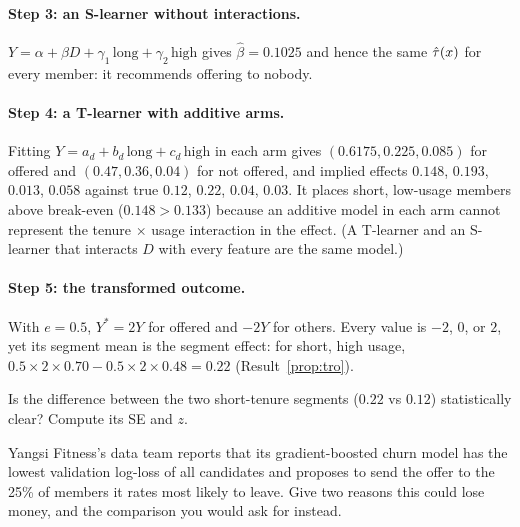 \documentclass[11pt]{article}
\begin{document}
\paragraph{Step 3: an S-learner without interactions.} $Y = \alpha + \beta D + \gamma_1\,\text{long} + \gamma_2\,\text{high}$
gives $\hat\beta = 0.1025$ and hence the same $\hat{\tau}(x)$ for every member: it recommends offering to nobody.

\paragraph{Step 4: a T-learner with additive arms.} Fitting $Y = a_d + b_d\,\text{long} + c_d\,\text{high}$ in each arm
gives $(0.6175, 0.225, 0.085)$ for offered and $(0.47, 0.36, 0.04)$ for not offered, and implied effects
$0.148$, $0.193$, $0.013$, $0.058$ against true $0.12$, $0.22$, $0.04$, $0.03$. It places short, low-usage members above
break-even ($0.148 > 0.133$) because an additive model in each arm cannot represent the tenure $\times$ usage
interaction in the effect. (A T-learner and an S-learner that interacts $D$ with every feature are the same
model.)

\paragraph{Step 5: the transformed outcome.} With $e = 0.5$, $Y^\ast = 2Y$ for offered and $-2Y$ for others. Every
value is $-2$, $0$, or $2$, yet its segment mean is the segment effect: for short, high usage,
$0.5 \times 2 \times 0.70 - 0.5 \times 2 \times 0.48 = 0.22$ (Result~\ref{prop:tro}).

\begin{exercise}[computation]
Is the difference between the two short-tenure segments ($0.22$ vs $0.12$) statistically clear? Compute its SE
and $z$.
\end{exercise}

\begin{exercise}[judgment]
Yangsi Fitness's data team reports that its gradient-boosted churn model has the lowest validation log-loss of all
candidates and proposes to send the offer to the 25\% of members it rates most likely to leave. Give two
reasons this could lose money, and the comparison you would ask for instead.
\end{exercise}
\end{document}
